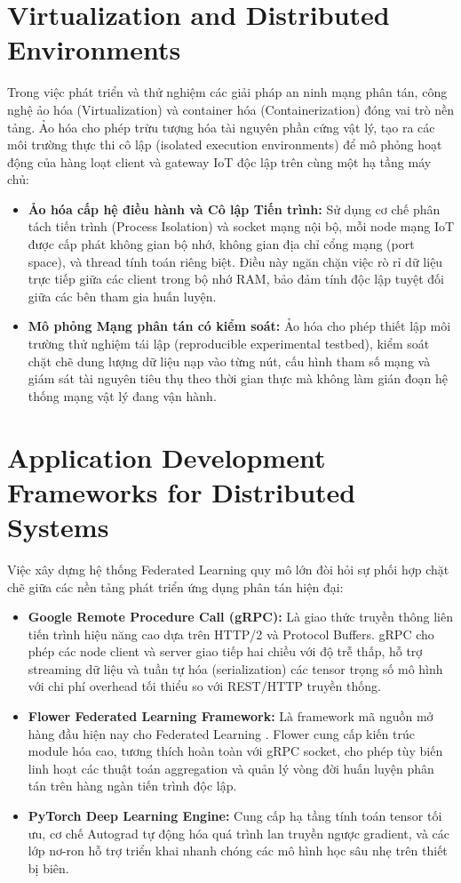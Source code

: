 \section{Virtualization and Distributed Environments}
\label{sec:lit_virtualization}
Trong việc phát triển và thử nghiệm các giải pháp an ninh mạng phân tán, công nghệ ảo hóa (Virtualization) và container hóa (Containerization) đóng vai trò nền tảng. Ảo hóa cho phép trừu tượng hóa tài nguyên phần cứng vật lý, tạo ra các môi trường thực thi cô lập (isolated execution environments) để mô phỏng hoạt động của hàng loạt client và gateway IoT độc lập trên cùng một hạ tầng máy chủ:
\begin{itemize}
    \item \textbf{Ảo hóa cấp hệ điều hành và Cô lập Tiến trình:} Sử dụng cơ chế phân tách tiến trình (Process Isolation) và socket mạng nội bộ, mỗi node mạng IoT được cấp phát không gian bộ nhớ, không gian địa chỉ cổng mạng (port space), và thread tính toán riêng biệt. Điều này ngăn chặn việc rò rỉ dữ liệu trực tiếp giữa các client trong bộ nhớ RAM, bảo đảm tính độc lập tuyệt đối giữa các bên tham gia huấn luyện.
    \item \textbf{Mô phỏng Mạng phân tán có kiểm soát:} Ảo hóa cho phép thiết lập môi trường thử nghiệm tái lập (reproducible experimental testbed), kiểm soát chặt chẽ dung lượng dữ liệu nạp vào từng nút, cấu hình tham số mạng và giám sát tài nguyên tiêu thụ theo thời gian thực mà không làm gián đoạn hệ thống mạng vật lý đang vận hành.
\end{itemize}

\section{Application Development Frameworks for Distributed Systems}
\label{sec:lit_frameworks}
Việc xây dựng hệ thống Federated Learning quy mô lớn đòi hỏi sự phối hợp chặt chẽ giữa các nền tảng phát triển ứng dụng phân tán hiện đại:
\begin{itemize}
    \item \textbf{Google Remote Procedure Call (gRPC):} Là giao thức truyền thông liên tiến trình hiệu năng cao dựa trên HTTP/2 và Protocol Buffers. gRPC cho phép các node client và server giao tiếp hai chiều với độ trễ thấp, hỗ trợ streaming dữ liệu và tuần tự hóa (serialization) các tensor trọng số mô hình với chi phí overhead tối thiểu so với REST/HTTP truyền thống.
    \item \textbf{Flower Federated Learning Framework:} Là framework mã nguồn mở hàng đầu hiện nay cho Federated Learning \cite{beutel2020flower}. Flower cung cấp kiến trúc module hóa cao, tương thích hoàn toàn với gRPC socket, cho phép tùy biến linh hoạt các thuật toán aggregation và quản lý vòng đời huấn luyện phân tán trên hàng ngàn tiến trình độc lập.
    \item \textbf{PyTorch Deep Learning Engine:} Cung cấp hạ tầng tính toán tensor tối ưu, cơ chế Autograd tự động hóa quá trình lan truyền ngược gradient, và các lớp nơ-ron hỗ trợ triển khai nhanh chóng các mô hình học sâu nhẹ trên thiết bị biên.
\end{itemize}

